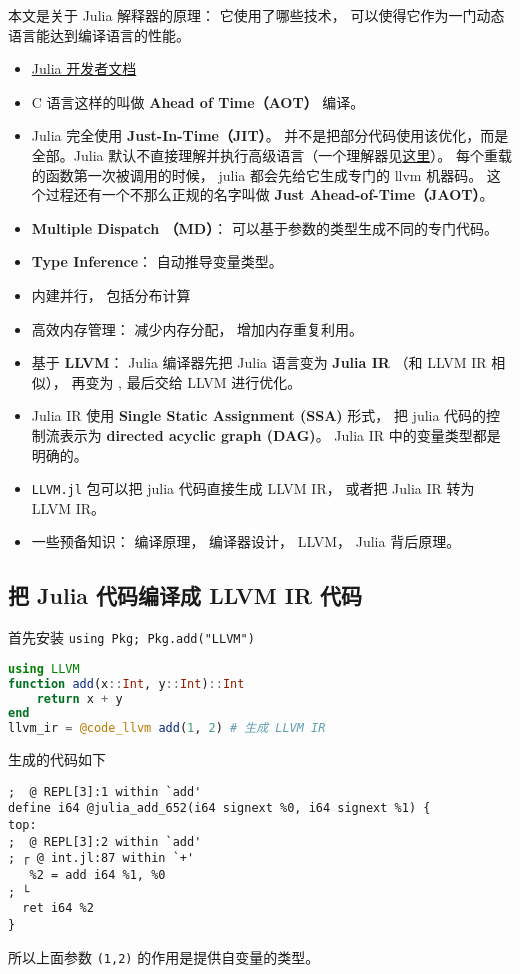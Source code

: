 
\begin{issues}
\issueDraft
\end{issues}

本文是关于 Julia 解释器的原理： 它使用了哪些技术， 可以使得它作为一门动态语言能达到编译语言的性能。

\begin{itemize}
\item \href{https://docs.julialang.org/en/v1/devdocs/init/}{Julia 开发者文档}
\item C 语言这样的叫做 \textbf{Ahead of Time（AOT）} 编译。
\item Julia 完全使用 \textbf{Just-In-Time（JIT）}。 并不是把部分代码使用该优化，而是全部。Julia 默认不直接理解并执行高级语言（一个理解器见\href{https://juliadebug.github.io/JuliaInterpreter.jl/stable/}{这里}）。 每个重载的函数第一次被调用的时候， julia 都会先给它生成专门的 llvm 机器码。 这个过程还有一个不那么正规的名字叫做 \textbf{Just Ahead-of-Time（JAOT）}。
\item \textbf{Multiple Dispatch （MD）}： 可以基于参数的类型生成不同的专门代码。
\item \textbf{Type Inference}： 自动推导变量类型。
\item 内建并行， 包括分布计算
\item 高效内存管理： 减少内存分配， 增加内存重复利用。
\item 基于 \textbf{LLVM}： Julia 编译器先把 Julia 语言变为 \textbf{Julia IR} （和 LLVM IR 相似）， 再变为 , 最后交给 LLVM 进行优化。
\item Julia IR 使用 \textbf{Single Static Assignment (SSA)} 形式， 把 julia 代码的控制流表示为 \textbf{directed acyclic graph (DAG)}。 Julia IR 中的变量类型都是明确的。
\item \verb`LLVM.jl` 包可以把 julia 代码直接生成 LLVM IR， 或者把 Julia IR 转为 LLVM IR。
\item 一些预备知识： 编译原理， 编译器设计， LLVM， Julia 背后原理。
\end{itemize}

\subsection{把 Julia 代码编译成 LLVM IR 代码}
首先安装 \verb`using Pkg; Pkg.add("LLVM")`
\begin{lstlisting}[language=julia]
using LLVM
function add(x::Int, y::Int)::Int
    return x + y
end
llvm_ir = @code_llvm add(1, 2) # 生成 LLVM IR
\end{lstlisting}
生成的代码如下
\begin{lstlisting}[language=none]
;  @ REPL[3]:1 within `add'
define i64 @julia_add_652(i64 signext %0, i64 signext %1) {
top:
;  @ REPL[3]:2 within `add'
; ┌ @ int.jl:87 within `+'
   %2 = add i64 %1, %0
; └
  ret i64 %2
}
\end{lstlisting}
所以上面参数 \verb`(1,2)` 的作用是提供自变量的类型。
